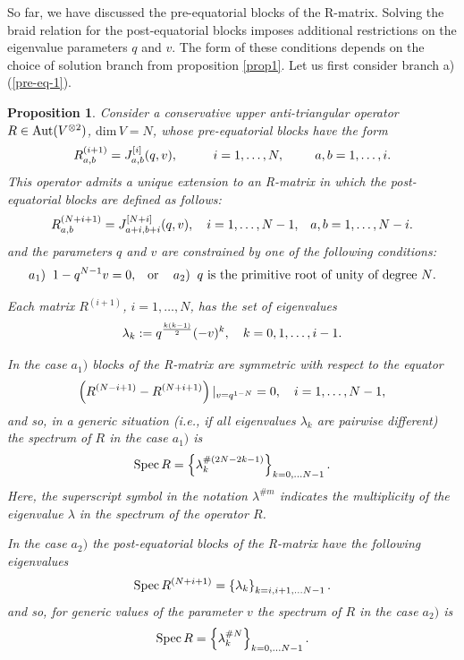 \documentclass[11pt]{article}
\def\be{\begin{equation}}\def\ee{\end{equation}}
\newcounter{theorem}\def\thetheorem{\thesection.\arabic{theorem}}\makeatletter
\newtheorem{prop}[theorem]{Proposition}
\begin{document}
So far, we have discussed the pre-equatorial blocks of the R-matrix. Solving the braid relation for the post-equatorial blocks imposes additional restrictions on the eigenvalue parameters $q$ and $v$. The form of these conditions depends on the choice of solution branch from proposition  \ref{prop1}. Let us first consider branch a) (\ref{pre-eq-1}).
\begin{prop}
	Consider a conservative upper anti-triangular operator $R\in {\rm Aut}(V^{\otimes 2})$, $\mbox{dim}\, V=N$, whose pre-equatorial blocks have the form
	 \be
	 \lb{gl2-1}
	 R^{(i+1)}_{a,b} = J^{[i]}_{a,b}(q,v), \qquad\;\;\; i=1,\dots ,N, \qquad\;\, a,b=1,\dots ,i.
	 \ee
	 This operator admits a unique extension to an R-matrix in which the post-equatorial blocks are defined as follows:
	 \be
	 \lb{gl2-2}
	 R^{(N+i+1)}_{a,b} = J^{[N+i]}_{a+i,b+i}(q,v), \quad i=1,\dots ,N-1, \;\;\; a,b=1,\dots ,N-i.
	 \ee
and the parameters $q$ and $v$ are constrained by one of the following conditions:
\be 
\lb{restrict-2}
\mbox{$a_1)$}\;\;
1-q^{N-1} v=0, \;\;\; \mbox{or\;\;\; $a_2)$}\;\; 
	\mbox{\rm $q$ is the
		primitive root of unity of degree $N$.}
\ee	

Each matrix $R^{(i+1)}$, $i=1,\dots ,N$, has the set of eigenvalues
\be 
\lb{eigen-1}
\lambda_k := q^{k(k-1)\over 2}(-v)^k,\quad k=0,1,\dots,i-1.
\ee
 
In the case $a_1)$ blocks of the R-matrix are symmetric with respect to the equator
 \be
 \lb{symm-eq}
\left( R^{(N-i+1)}-R^{(N+i+1)}\right)\vert_{v=q^{1-N}}=0, \quad i=1,\dots , N-1,
 \ee
 and so, in a generic situation (i.e., if all eigenvalues $\lambda_k$ are pairwise different) the spectrum of $R$ in the case $a_1)$ is
 \be 
\lb{specR-a1}
{\rm Spec\,} R = \left\{  \lambda_k^{\# (2N-2k-1)}   \right\}_{k=0,\dots N-1}.
\ee
Here, the superscript symbol in the notation $\lambda^{\# m}$ indicates the multiplicity of the eigenvalue $\lambda$ in the spectrum of the operator $R$.

In the case $a_2)$ the post-equatorial blocks of the R-matrix have the following eigenvalues
\be
\lb{eigen-2}
{\rm Spec\,} R^{(N+i+1)} = \left\{  \lambda_k   \right\}_{k=i,i+1,\dots N-1}.
\ee
and so, for generic values of the parameter $v$ the spectrum of $R$ in the case $a_2)$ is
\be 
\lb{specR-a2}
{\rm Spec\,} R = \left\{  \lambda_k^{\# N}   \right\}_{k=0,\dots N-1}.
\ee
\end{prop}
\end{document}

